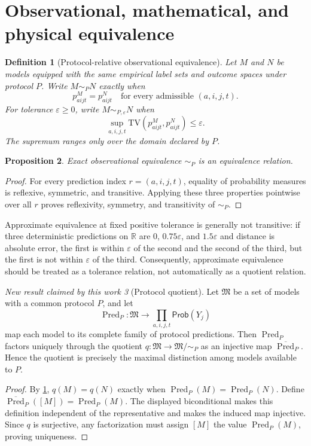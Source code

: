 \documentclass[11pt]{article}
\newtheorem{definition}{Definition}[section]
\newtheorem{proposition}[definition]{Proposition}
\theoremstyle{remark}
\newtheorem{newresult}[definition]{New result claimed by this work}
\newcommand{\Real}{\mathbb{R}}
\newcommand{\Prob}{\mathsf{Prob}}
\newcommand{\TV}{\mathrm{TV}}
\begin{document}
\section{Observational, mathematical, and physical equivalence}

\begin{definition}[Protocol-relative observational equivalence]\label{def:obseq}
Let $M$ and $N$ be models equipped with the same empirical label sets and outcome spaces under protocol $P$.  Write $M\sim_P N$ exactly when
\[
 p^M_{aijt}=p^N_{aijt}
 \quad\text{for every admissible }(a,i,j,t).
\]
For tolerance $\varepsilon\geq0$, write $M\sim_{P,\varepsilon}N$ when
\[
 \sup_{a,i,j,t}\TV\!\left(p^M_{aijt},p^N_{aijt}\right)\leq\varepsilon.
\]
The supremum ranges only over the domain declared by $P$.
\end{definition}

\begin{proposition}\label{prop:equivrel}
Exact observational equivalence $\sim_P$ is an equivalence relation.
\end{proposition}
\begin{proof}
For every prediction index $r=(a,i,j,t)$, equality of probability measures is reflexive, symmetric, and transitive.  Applying these three properties pointwise over all $r$ proves reflexivity, symmetry, and transitivity of $\sim_P$.
\end{proof}

Approximate equivalence at fixed positive tolerance is generally not transitive: if three deterministic predictions on $\Real$ are $0$, $0.75\varepsilon$, and $1.5\varepsilon$ and distance is absolute error, the first is within $\varepsilon$ of the second and the second of the third, but the first is not within $\varepsilon$ of the third.  Consequently, approximate equivalence should be treated as a tolerance relation, not automatically as a quotient relation.

\begin{newresult}[Protocol quotient]\label{res:quotient}
Let $\mathfrak M$ be a set of models with a common protocol $P$, and let
\[
 \operatorname{Pred}_P:\mathfrak M\longrightarrow
 \prod_{a,i,j,t}\Prob(Y_j)
\]
map each model to its complete family of protocol predictions.  Then $\operatorname{Pred}_P$ factors uniquely through the quotient $q:\mathfrak M\to\mathfrak M/{\sim_P}$ as an injective map $\overline{\operatorname{Pred}}_P$.  Hence the quotient is precisely the maximal distinction among models available to $P$.
\end{newresult}
\begin{proof}
By \cref{def:obseq}, $q(M)=q(N)$ exactly when $\operatorname{Pred}_P(M)=\operatorname{Pred}_P(N)$.  Define $\overline{\operatorname{Pred}}_P([M])=\operatorname{Pred}_P(M)$.  The displayed biconditional makes this definition independent of the representative and makes the induced map injective.  Since $q$ is surjective, any factorization must assign $[M]$ the value $\operatorname{Pred}_P(M)$, proving uniqueness.
\end{proof}
\end{document}
